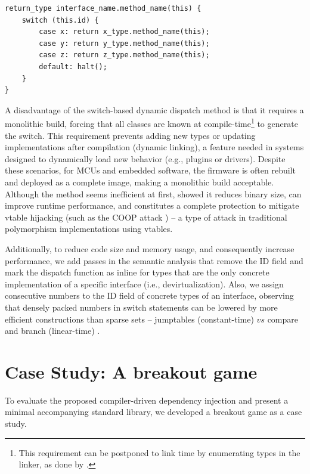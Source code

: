 \documentclass[10pt,sigplan,screen,anonymous]{acmart}
\begin{document}
\begin{lstlisting}[caption=Interface switch-based template for dynamic dispatch using the id field., label=lst:interfacestub]
return_type interface_name.method_name(this) {
    switch (this.id) {
        case x: return x_type.method_name(this);
        case y: return y_type.method_name(this);
        case z: return z_type.method_name(this);
        default: halt();
    }
}
\end{lstlisting}


A disadvantage of the switch-based dynamic dispatch method is that it requires a monolithic build, forcing that all classes are known at compile-time\footnote{This requirement can be postponed to link time by enumerating types in the linker, as done by \citet{bauer2021novt}.} to generate the switch. This requirement prevents adding new types or updating implementations after compilation (dynamic linking), a feature needed in systems designed to dynamically load new behavior (e.g., plugins or drivers). Despite these scenarios, for MCUs and embedded software, the firmware is often rebuilt and deployed as a complete image, making a monolithic build acceptable. Although the method seems inefficient at first, \citet{bauer2021novt} showed it reduces binary size, can improve runtime performance, and constitutes a complete protection to mitigate vtable hijacking (such as the COOP attack \cite{schuster2015}) -- a type of attack in traditional polymorphism implementations using vtables. 

Additionally, to reduce code size and memory usage, and consequently increase performance, we add passes in the semantic analysis that remove the ID field and mark the dispatch function as inline for types that are the only concrete implementation of a specific interface (i.e., devirtualization). Also, we assign consecutive numbers to the ID field of concrete types of an interface, observing that densely packed numbers in switch statements can be lowered by more efficient constructions than sparse sets -- jumptables (constant-time) $vs$ compare and branch (linear-time) \cite[Chap. 6]{scott2016plp}.


\section{Case Study: A breakout game} \label{sec:breakout}

To evaluate the proposed compiler-driven dependency injection and present a minimal accompanying standard library, we developed a breakout game as a case study.
\end{document}
